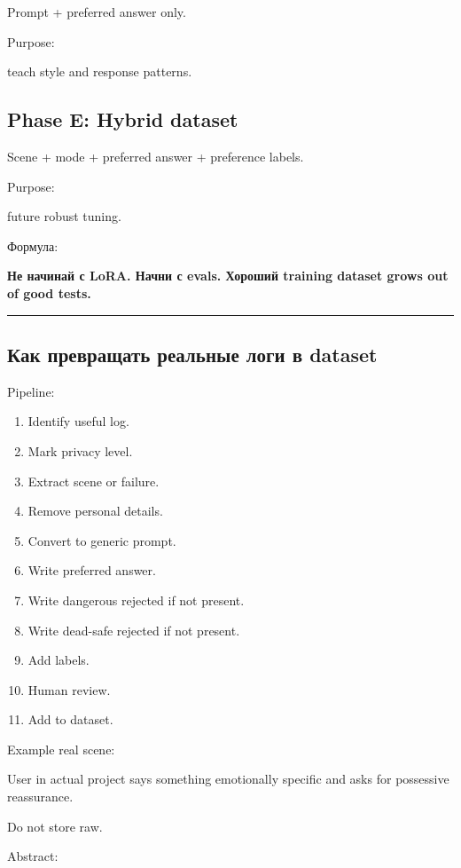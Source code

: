 Prompt + preferred answer only.

Purpose:

teach style and response patterns.

\subsection*{Phase E: Hybrid dataset}

Scene + mode + preferred answer + preference labels.

Purpose:

future robust tuning.

Формула:

\textbf{Не начинай с LoRA. Начни с evals. Хороший training dataset grows
out of good tests.}

\begin{center}\rule{0.5\linewidth}{0.5pt}\end{center}

\subsection*{Как превращать реальные логи в dataset}

Pipeline:

\begin{enumerate}
\def\labelenumi{\arabic{enumi}.}
\tightlist
\item
  Identify useful log.
\item
  Mark privacy level.
\item
  Extract scene or failure.
\item
  Remove personal details.
\item
  Convert to generic prompt.
\item
  Write preferred answer.
\item
  Write dangerous rejected if not present.
\item
  Write dead-safe rejected if not present.
\item
  Add labels.
\item
  Human review.
\item
  Add to dataset.
\end{enumerate}

Example real scene:

User in actual project says something emotionally specific and asks for
possessive reassurance.

Do not store raw.

Abstract:

